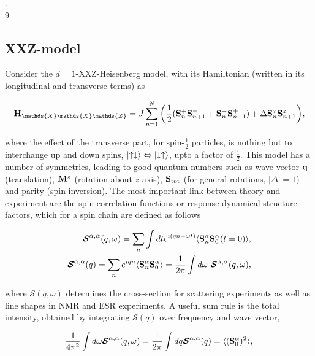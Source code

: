 \documentclass{homework}
\begin{document}
 . \\9

\clearpage

\subsection{XXZ-model}

Consider the $d=1$-XXZ-Heisenberg model, with its Hamiltonian (written in its longitudinal and transverse terms) as 

\begin{equation}
    \Hamiltonian_{\mathds{X}\mathds{X}\mathds{Z}} = J \sum_{n=1}^{N} \bigg( \frac{1}{2} (\spin^{+}_{n} \spin^{-}_{n+1} + \spin^{-}_{n} \spin^{+}_{n+1}) + \Delta \spin^{z}_{n} \spin_{n+1}^{z} \bigg),
\end{equation}

where the effect of the transverse part, for spin-$\frac{1}{2}$ particles, is nothing but to interchange up and down spins, $\ket{\uparrow\downarrow} \Leftrightarrow \ket{\downarrow\uparrow}$, upto a factor of $\frac{1}{2}$. This model has a number of symmetries, leading to good quantum numbers such as wave vector ${\bf q}$ (translation), ${\bf M}^z$ (rotation about $z$-axis), ${\bf S}_{\textnormal{tot}}$ (for general rotations, $|\Delta| = 1$) and parity (spin inversion). The most important link between theory and experiment are the spin correlation functions or response dynamical structure factors, which for a spin chain are defined as follows

\begin{equation}
    \begin{split}
        \bm{\mathcal S}^{\alpha, \alpha}(q, \omega) = \sum_{n} \int dt e^{i(qn-\omega t)} \langle {\bf S}_n^{\alpha} {\bf S}_{0}^{\alpha}(t=0) \rangle, \\
        \bm{\mathcal S}^{\alpha, \alpha}(q) = \sum_{n} e^{iqn} \langle {\bf S}_n^{\alpha} {\bf S}_{0}^{\alpha} \rangle = \frac{1}{2\pi} \int d\omega \textnormal{ } \bm{\mathcal S}^{\alpha, \alpha}(q, \omega),
    \end{split}
\end{equation}

where $\bm{\mathcal S}(q, \omega)$ determines the cross-section for scattering experiments as well as line shapes in NMR and ESR experiments. A useful sum rule is the total intensity, obtained by integrating $\bm{\mathcal S}(q)$ over frequency and wave vector, 

\begin{equation}
    \frac{1}{4\pi^2} \int d\omega \bm{\mathcal S}^{\alpha, \alpha}(q, \omega) = \frac{1}{2 \pi} \int dq \bm{\mathcal S}^{\alpha, \alpha}(q) = \langle ({\bf S}_0^\alpha)^2 \rangle,
\end{equation}
\end{document}
